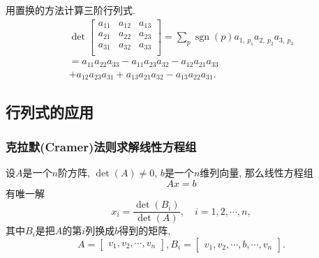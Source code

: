 \begin{example}
    用置换的方法计算三阶行列式.
    \begin{equation}
        \begin{gathered}
            \det \begin{bmatrix}
             a_{11} & a_{12} & a_{13}\\
             a_{21} & a_{22} & a_{23}\\
             a_{31} & a_{32} & a_{33}\\
            \end{bmatrix} = 
              \sum_{p} \operatorname{sgn} \left( p \right) a_{1,\  p_1} a_{2,\  p_2} a_{3,\  p_3}
              \\
              =
              a_{11} a_{22} a_{33} - a_{11} a_{23} a_{32} - a_{12} a_{21} a_{33} \\ + a_{12} a_{23} a_{31} + a_{13} a_{21} a_{32} - a_{13} a_{22} a_{31}.
          \end{gathered}
    \end{equation}
\end{example}

\subsection{行列式的应用}
\subsubsection{克拉默(Cramer)法则求解线性方程组}
\begin{theorem}
    设$A$是一个$n$阶方阵, $\det \left( A \right) \neq 0$, $b$是一个$n$维列向量, 那么线性方程组
    \begin{equation}
      Ax = b
    \end{equation}
    有唯一解
    \begin{equation}
      x_i = \frac{\det \left( B_i \right)}{\det \left( A \right)}, \quad i = 1,2, \cdots , n,
    \end{equation}
    其中$B_i$是把$A$的第$i$列换成$b$得到的矩阵,
    \begin{equation}
      A = \begin{bmatrix} v_1, v_2, \cdots, v_n \end{bmatrix}, B_i = \begin{bmatrix} v_1, v_2, \cdots, b, \cdots, v_n \end{bmatrix}.
    \end{equation}
\end{theorem}

